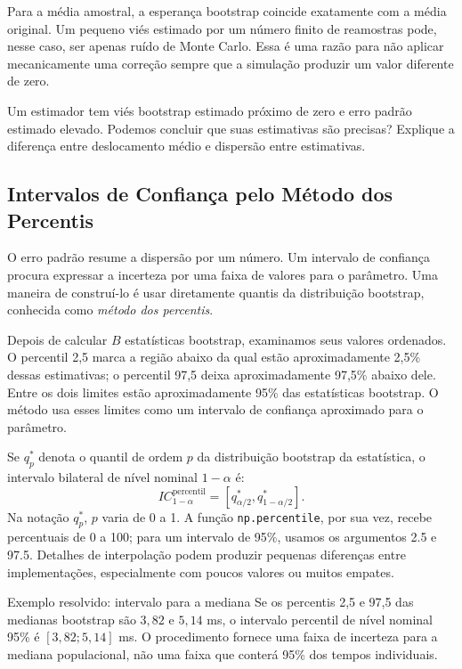 \documentclass[12pt,a4paper]{article}
\begin{document}
Para a média amostral, a esperança bootstrap coincide exatamente com a média original. Um pequeno viés estimado por um número finito de reamostras pode, nesse caso, ser apenas ruído de Monte Carlo. Essa é uma razão para não aplicar mecanicamente uma correção sempre que a simulação produzir um valor diferente de zero.

\begin{perguntabox}
Um estimador tem viés bootstrap estimado próximo de zero e erro padrão estimado elevado. Podemos concluir que suas estimativas são precisas? Explique a diferença entre deslocamento médio e dispersão entre estimativas.
\end{perguntabox}

\subsection{Intervalos de Confiança pelo Método dos Percentis}
\label{subsec:ic}
O erro padrão resume a dispersão por um número. Um intervalo de confiança procura expressar a incerteza por uma faixa de valores para o parâmetro. Uma maneira de construí-lo é usar diretamente quantis da distribuição bootstrap, conhecida como \emph{método dos percentis}.

Depois de calcular $B$ estatísticas bootstrap, examinamos seus valores ordenados. O percentil 2,5 marca a região abaixo da qual estão aproximadamente 2,5\% dessas estimativas; o percentil 97,5 deixa aproximadamente 97,5\% abaixo dele. Entre os dois limites estão aproximadamente 95\% das estatísticas bootstrap. O método usa esses limites como um intervalo de confiança aproximado para o parâmetro.

Se $q_p^*$ denota o quantil de ordem $p$ da distribuição bootstrap da estatística, o intervalo bilateral de nível nominal $1-\alpha$ é:
\[
IC_{1-\alpha}^{\mathrm{percentil}}=[q_{\alpha/2}^*,q_{1-\alpha/2}^*].
\]
Na notação $q_p^*$, $p$ varia de 0 a 1. A função \texttt{np.percentile}, por sua vez, recebe percentuais de 0 a 100; para um intervalo de 95\%, usamos os argumentos 2.5 e 97.5. Detalhes de interpolação podem produzir pequenas diferenças entre implementações, especialmente com poucos valores ou muitos empates.

\begin{exemplobox}{Exemplo resolvido: intervalo para a mediana}
Se os percentis 2,5 e 97,5 das medianas bootstrap são $3{,}82$ e $5{,}14$ ms, o intervalo percentil de nível nominal 95\% é $[3{,}82;5{,}14]$ ms. O procedimento fornece uma faixa de incerteza para a mediana populacional, não uma faixa que conterá 95\% dos tempos individuais.
\end{exemplobox}
\end{document}
